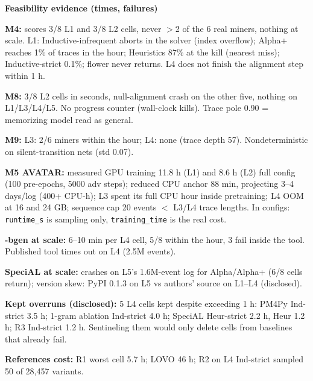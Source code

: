 \documentclass[10pt,twocolumn]{article}
\newcommand{\hdr}[1]{\vspace{5pt}\noindent\textcolor{hd}{\textbf{\large #1}}\par\vspace{2pt}}
\newcommand{\kv}[2]{\noindent\textbf{#1} #2\par}
\begin{document}
\hdr{Feasibility evidence (times, failures)}
\kv{M4:}{scores 3/8 L1 and 3/8 L2 cells, never $>$2 of the 6 real miners, nothing at scale. L1: Inductive-infrequent aborts in the solver (index overflow); Alpha+ reaches 1\% of traces in the hour; Heuristics 87\% at the kill (nearest miss); Inductive-strict 0.1\%; flower never returns. L4 does not finish the alignment step within 1 h.}
\kv{M8:}{3/8 L2 cells in seconds, null-alignment crash on the other five, nothing on L1/L3/L4/L5. No progress counter (wall-clock kills). Trace pole 0.90 = memorizing model read as general.}
\kv{M9:}{L3: 2/6 miners within the hour; L4: none (trace depth 57). Nondeterministic on silent-transition nets (std 0.07).}
\kv{M5 AVATAR:}{measured GPU training 11.8 h (L1) and 8.6 h (L2) full config (100 pre-epochs, 5000 adv steps); reduced CPU anchor 88 min, projecting 3--4 days/log (400+ CPU-h); L3 spent its full CPU hour inside pretraining; L4 OOM at 16 and 24 GB; sequence cap 20 events $<$ L3/L4 trace lengths. In configs: \texttt{runtime\_s} is sampling only, \texttt{training\_time} is the real cost.}
\kv{-bgen at scale:}{6--10 min per L4 cell, 5/8 within the hour, 3 fail inside the tool. Published tool times out on L4 (2.5M events).}
\kv{SpeciAL at scale:}{crashes on L5's 1.6M-event log for Alpha/Alpha+ (6/8 cells return); version skew: PyPI 0.1.3 on L5 vs authors' source on L1--L4 (disclosed).}
\kv{Kept overruns (disclosed):}{5 L4 cells kept despite exceeding 1 h: PM4Py Ind-strict 3.5 h; 1-gram ablation Ind-strict 4.0 h; SpeciAL Heur-strict 2.2 h, Heur 1.2 h; R3 Ind-strict 1.2 h. Sentineling them would only delete cells from baselines that already fail.}
\kv{References cost:}{R1 worst cell 5.7 h; LOVO 46 h; R2 on L4 Ind-strict sampled 50 of 28{,}457 variants.}
\end{document}
